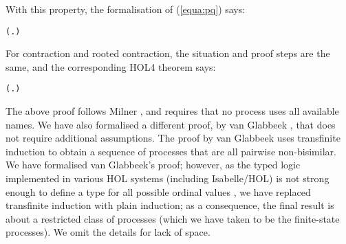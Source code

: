 With this property, the formalisation of (\ref{equa:pq}) says:
\begin{alltt}
\HOLTokenTurnstile{}   \HOLSymConst{\HOLTokenConj{}}   \HOLSymConst{\HOLTokenImp{}} (\HOLSymConst{\HOLTokenForall{}}.  \HOLSymConst{+}  \HOLSymConst{\HOLTokenWeakEQ}  \HOLSymConst{+} ) \HOLSymConst{\HOLTokenImp{}}  \HOLSymConst{\HOLTokenObsCongr} 
\end{alltt}

For contraction and rooted contraction, the situation and proof
steps are the same, and the corresponding HOL4 theorem says:
\begin{alltt}
\HOLTokenTurnstile{}   \HOLSymConst{\HOLTokenConj{}}   \HOLSymConst{\HOLTokenImp{}} (\HOLSymConst{\HOLTokenForall{}}.  \HOLSymConst{+}  \HOLSymConst{\HOLTokenContracts{}}  \HOLSymConst{+} ) \HOLSymConst{\HOLTokenImp{}}  \HOLSymConst{\HOLTokenObsContracts} 
\end{alltt}

The above proof follows 
Milner \cite{Mil89}, and requires
 that no process uses all available names. 
We have also formalised a different proof, 
by
 van Glabbeek
 \cite{vanGlabbeek:2005ur}, that does not require additional
 assumptions. 
The proof by van Glabbeek uses transfinite induction to obtain 
a sequence of processes %
 that are all pairwise non-bisimilar. 
We have formalised van Glabbeek's proof; however, as 
the typed logic
implemented in various HOL systems (including Isabelle/HOL) is not
strong enough to define a type for all possible ordinal values \cite{norrish2013ordinals},
we have replaced transfinite induction with plain induction; as a consequence, the final
result is about a restricted class of processes (which we have taken
to be the finite-state processes). We omit the details for lack of
space. %

